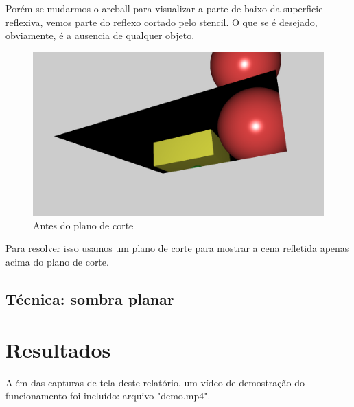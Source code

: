 \documentclass[11pt, a4paper]{article}
\begin{document}
Porém se mudarmos o arcball para visualizar a parte de baixo da superficie reflexiva, 
vemos parte do reflexo cortado pelo stencil. O que se é desejado, obviamente, é 
a ausencia de qualquer objeto.

\begin{figure}[H]
  \begin{center}
  \includegraphics[width=0.8\linewidth]{before-cut-plan.png}
  \caption{Antes do plano de corte}
  \label{fig:vaz}
  \end{center}
\end{figure}

Para resolver isso usamos um plano de corte para mostrar a cena refletida apenas
acima do plano de corte.


\subsection {Técnica: sombra planar}


\section {Resultados}

Além das capturas de tela deste relatório, um vídeo de demostração do funcionamento 
foi incluído: arquivo "demo.mp4".
\end{document}
